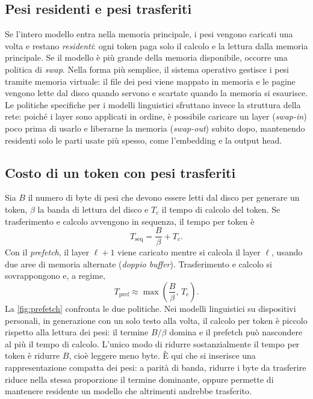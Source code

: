 \subsection{Pesi residenti e pesi trasferiti}

Se l'intero modello entra nella memoria principale, i pesi vengono caricati una volta e restano \emph{residenti}: ogni token paga solo il calcolo e la lettura dalla memoria principale. Se il modello è più grande della memoria disponibile, occorre una politica di \emph{swap}. Nella forma più semplice, il sistema operativo gestisce i pesi tramite memoria virtuale: il file dei pesi viene mappato in memoria e le pagine vengono lette dal disco quando servono e scartate quando la memoria si esaurisce. Le politiche specifiche per i modelli linguistici sfruttano invece la struttura della rete: poiché i layer sono applicati in ordine, è possibile caricare un layer (\emph{swap-in}) poco prima di usarlo e liberarne la memoria (\emph{swap-out}) subito dopo, mantenendo residenti solo le parti usate più spesso, come l'embedding e la output head.

\subsection{Costo di un token con pesi trasferiti}

Sia $B$ il numero di byte di pesi che devono essere letti dal disco per generare un token, $\beta$ la banda di lettura del disco e $T_c$ il tempo di calcolo del token. Se trasferimento e calcolo avvengono in sequenza, il tempo per token è
\begin{equation}
T_{\mathrm{seq}} = \frac{B}{\beta} + T_c .
\label{eq:tempo-sequenziale}
\end{equation}
Con il \emph{prefetch}, il layer $\ell+1$ viene caricato mentre si calcola il layer $\ell$, usando due aree di memoria alternate (\emph{doppio buffer}). Trasferimento e calcolo si sovrappongono e, a regime,
\begin{equation}
T_{\mathrm{pref}} \approx \max\!\left(\frac{B}{\beta},\,T_c\right).
\label{eq:tempo-prefetch}
\end{equation}
La \autoref{fig:prefetch} confronta le due politiche. Nei modelli linguistici su dispositivi personali, in generazione con un solo testo alla volta, il calcolo per token è piccolo rispetto alla lettura dei pesi: il termine $B/\beta$ domina e il prefetch può nascondere al più il tempo di calcolo. L'unico modo di ridurre sostanzialmente il tempo per token è ridurre $B$, cioè leggere meno byte. È qui che si inserisce una rappresentazione compatta dei pesi: a parità di banda, ridurre i byte da trasferire riduce nella stessa proporzione il termine dominante, oppure permette di mantenere residente un modello che altrimenti andrebbe trasferito.

